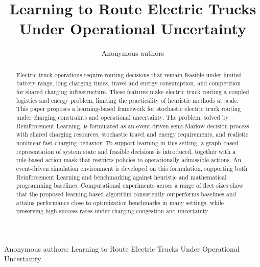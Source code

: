 \documentclass[journal]{IEEEtran}
\begin{document}
\title{Learning to Route Electric Trucks Under Operational Uncertainty}

\author{Anonymous authors}

%
{Anonymous authors: Learning to Route Electric Trucks Under Operational Uncertainty}

\maketitle

\begin{abstract}
Electric truck operations require routing decisions that remain feasible under limited battery range, long charging times, travel and energy consumption, and competition for shared charging infrastructure. These features make electric truck routing a coupled logistics and energy problem, limiting the practicality of heuristic methods at scale. This paper proposes a learning-based framework for stochastic electric truck routing under charging constraints and operational uncertainty. The problem, solved by Reinforcement Learning, is formulated as an event-driven semi-Markov decision process with shared charging resources, stochastic travel and energy requirements, and realistic nonlinear fast-charging behavior. To support learning in this setting, a graph-based representation of system state and feasible decisions is introduced, together with a rule-based action mask that restricts policies to operationally admissible actions. An event-driven simulation environment is developed on this formulation, supporting both Reinforcement Learning and benchmarking against heuristic and mathematical programming baselines. Computational experiments across a range of fleet sizes show that the proposed learning-based algorithm consistently outperforms baselines and attains performance close to optimization benchmarks in many settings, while preserving high success rates under charging congestion and uncertainty.
\end{abstract}
\end{document}
